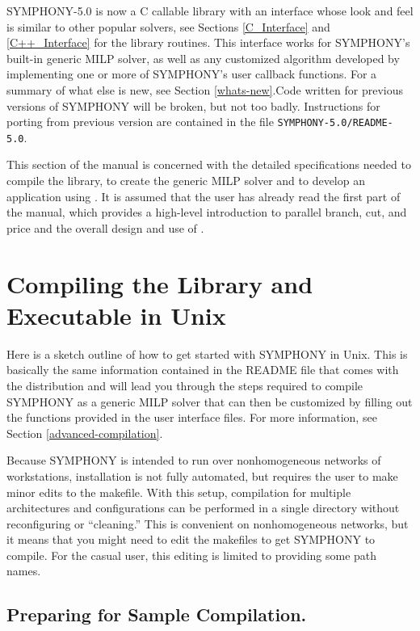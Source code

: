 SYMPHONY-5.0 is now a C callable library with an interface whose look and
feel is similar to other popular solvers, see Sections \ref{C_Interface} and
\ref{C++_Interface} for the library routines. This interface works for
SYMPHONY's built-in generic MILP solver, as well as any customized algorithm 
developed by implementing one or more of SYMPHONY's user callback functions. 
For a summary of what else is new, see Section \ref{whats-new}.Code written for
previous versions of SYMPHONY will be broken, but not too badly. Instructions
for porting from previous version are contained in the file
\texttt{SYMPHONY-5.0/README-5.0}.

This section of the manual is concerned with the detailed
specifications needed to compile the \BB library, to create the generic 
MILP solver and to develop an application using \BB. It is
assumed that the user has already read the first part of the manual, which
provides a high-level introduction to parallel branch, cut, and price
and the overall design and use of \BB. 


\section{Compiling the Library and Executable in Unix}

\label{getting_started_unix}

Here is a sketch outline of how to get started with SYMPHONY in Unix. This is
basically the same information contained in the README file that comes with
the distribution and will lead you through the steps required to compile
SYMPHONY as a generic MILP solver that can then be customized by filling out
the functions provided in the user interface files. For more information, see
Section \ref{advanced-compilation}. 

Because SYMPHONY is intended to run over
nonhomogeneous networks of workstations, installation is not fully automated,
but requires the user to make minor edits to the makefile.  With this setup,
compilation for multiple architectures and configurations can be performed in
a single directory without reconfiguring or ``cleaning.'' This is convenient
on nonhomogeneous networks, but it means that you might need to edit the
makefiles to get SYMPHONY to compile. For the casual user, this editing is
limited to providing some path names.

\subsection{Preparing for Sample Compilation.}

